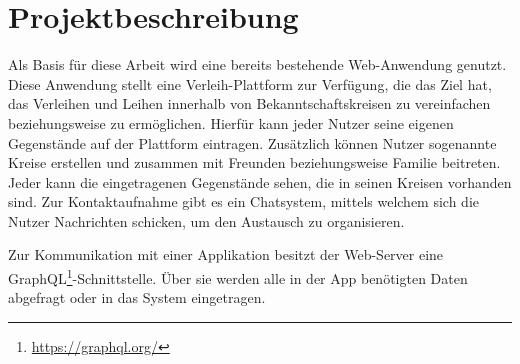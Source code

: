 \section{Projektbeschreibung}
Als Basis für diese Arbeit wird eine bereits bestehende Web-Anwendung genutzt. Diese Anwendung stellt eine Verleih-Plattform zur Verfügung, die das Ziel hat, das Verleihen und Leihen innerhalb von Bekanntschaftskreisen zu vereinfachen beziehungsweise zu ermöglichen. Hierfür kann jeder Nutzer seine eigenen Gegenstände auf der Plattform eintragen. Zusätzlich können Nutzer sogenannte Kreise erstellen und zusammen mit Freunden beziehungsweise Familie beitreten. Jeder kann die eingetragenen Gegenstände sehen, die in seinen Kreisen vorhanden sind. Zur Kontaktaufnahme gibt es ein Chatsystem, mittels welchem sich die Nutzer Nachrichten schicken, um den Austausch zu organisieren. 

Zur Kommunikation mit einer Applikation besitzt der Web-Server eine GraphQL\footnote{\url{https://graphql.org/}}-Schnittstelle. Über sie werden alle in der App benötigten Daten abgefragt oder in das System eingetragen.